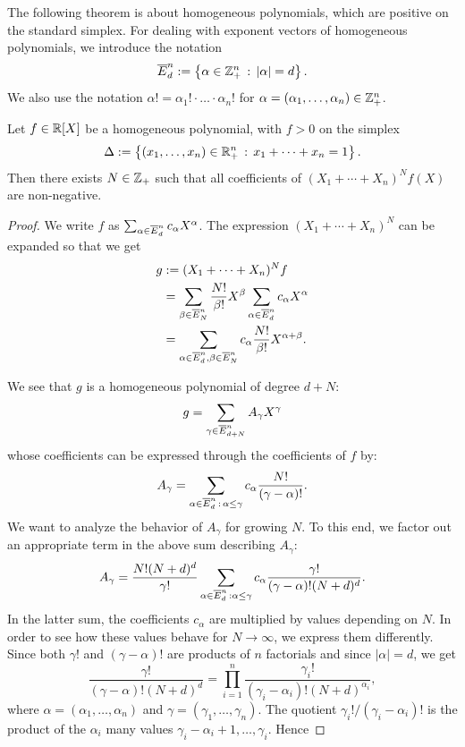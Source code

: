 The following theorem is about homogeneous polynomials, which are positive on the standard simplex.
For dealing with exponent vectors of homogeneous polynomials, we introduce the notation 
\[
	\overline{E}^n_d := \left\{ \alpha \in \mathbb{Z}_+^n \,:\, |\alpha | =d \right\}.
\]
We also use the notation $\alpha ! = \alpha_1 ! \cdot \ldots \cdot \alpha_n !$ for $\alpha = (\alpha_1,\ldots,\alpha_n) \in \mathbb{Z}^n_+$.


\begin{theorem}[P\'olya 1928] 
	Let $f \in \mathbb{R}[X]$ be a homogeneous polynomial, with $f> 0$ on the simplex 
	\[
		\Delta := \left\{ (x_1,\ldots,x_n) \in \mathbb{R}_+^n \,:\, x_1 + \cdots + x_n =1 \right\}.
	\]
	Then there exists $N \in \mathbb{Z}_+$ such that all coefficients of $(X_1 + \cdots + X_n)^N f(X)$ are non-negative. 
\end{theorem}
\begin{proof}

	We write $f$ as $\sum_{\alpha \in \overline{E}^n_d} c_\alpha X^\alpha$. The expression $(X_1 + \cdots + X_n)^N$ can be expanded so that we get
	\begin{align*}
		 g & := (X_1+ \cdots + X_n)^N f 
		 \\ & = \sum_{\beta \in \overline{E}^n_N} \frac{N!}{\beta !} X^\beta \sum_{\alpha \in \overline{E}^n_d} c_\alpha X^\alpha 
		 \\ & = \sum_{\alpha \in \overline{E}^n_d, \beta \in \overline{E}^n_N} c_\alpha \frac{N!}{\beta!} X^{\alpha+\beta}.
	\end{align*}
	
	We see that $g$ is a homogeneous polynomial of degree $d+N$:
	\[
		g = \sum_{\gamma \in \overline{E}^n_{d+N}} A_\gamma X^\gamma
	\]
	whose coefficients can be expressed through the coefficients of $f$ by:
	\begin{equation}
		\label{A:gamma:first:eq}
		A_\gamma = \sum_{\alpha \in \overline{E}^n_d \,:\, \alpha \le \gamma} c_\alpha \frac{N!}{(\gamma-\alpha)!} .
	\end{equation}
	We want to analyze the behavior of $A_\gamma$ for growing $N$. To this end, we factor out an appropriate term in the above sum describing $A_\gamma$:
	\[
		A_\gamma = \frac{N!(N+d)^d}{\gamma!} \sum_{\alpha \in \overline{E}^n_d \, : \alpha \le \gamma} c_\alpha \frac{\gamma !}{(\gamma-\alpha)! (N+d)^d}.
	\]
	In the latter sum, the coefficients $c_\alpha$ are multiplied by values depending on $N$. In order to see how these values behave for $N \to \infty$, we express them differently. Since both $\gamma!$ and $(\gamma-\alpha)!$ are products of $n$ factorials and since $|\alpha|=d$, we get
	\[
		\frac{\gamma!}{(\gamma-\alpha)! (N+d)^d} = \prod_{i=1}^n \frac{\gamma_i !}{(\gamma_i-\alpha_i)! (N+d)^{\alpha_i}} ,
	\]
	where $\alpha = (\alpha_1,\ldots,\alpha_n)$ and $\gamma=(\gamma_1,\ldots,\gamma_n)$. The quotient $\gamma_i! / (\gamma_i-\alpha_i)!$ is the product of the $\alpha_i$ many values $\gamma_i-\alpha_i+1,\ldots,\gamma_i$. Hence 
	

\end{proof}
